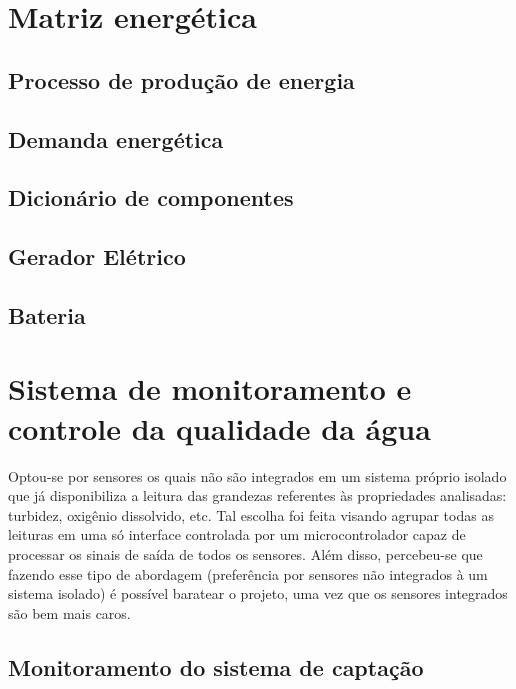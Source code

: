   \section{Matriz energética}
  	\subsection{Processo de produção de energia}
  		
  	\subsection{Demanda energética}
  		
  	\subsection{Dicionário de componentes}
  		
  	\subsection{Gerador Elétrico}
  		
  	\subsection{Bateria}
  		
    
  \section{Sistema de monitoramento e controle da qualidade da água}
    
    
      Optou-se por sensores os quais não são integrados em um sistema próprio isolado que já disponibiliza a leitura das grandezas
      referentes às propriedades analisadas: turbidez, oxigênio dissolvido, etc. Tal escolha foi feita visando agrupar todas as
      leituras em uma só interface controlada por um microcontrolador capaz de processar os sinais de saída de todos os sensores.
      Além disso, percebeu-se que fazendo esse tipo de abordagem (preferência por sensores não integrados à um sistema isolado)
      é possível baratear o projeto, uma vez que os sensores integrados são bem mais caros.
    
    \subsection{Monitoramento do sistema de captação}
      
